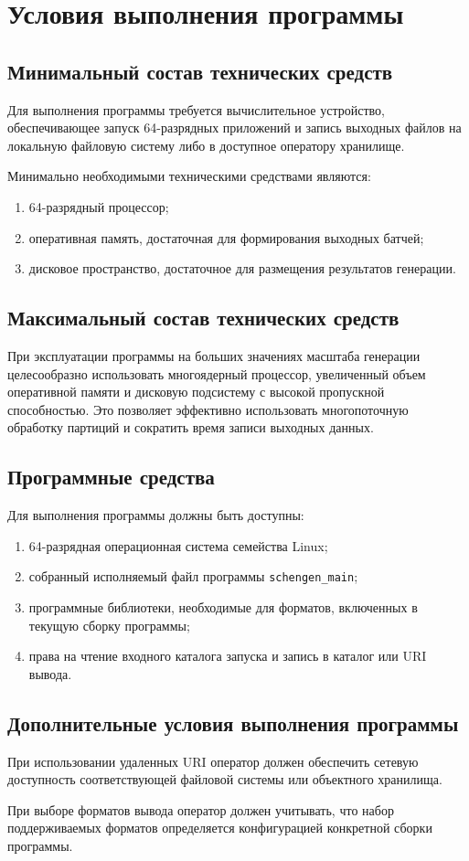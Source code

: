 \section{Условия выполнения программы}

\subsection{Минимальный состав технических средств}

Для выполнения программы требуется вычислительное устройство, обеспечивающее
запуск 64-разрядных приложений и запись выходных файлов на локальную файловую
систему либо в доступное оператору хранилище.

Минимально необходимыми техническими средствами являются:
\begin{enumerate}
    \item 64-разрядный процессор;
    \item оперативная память, достаточная для формирования выходных батчей;
    \item дисковое пространство, достаточное для размещения результатов
    генерации.
\end{enumerate}

\subsection{Максимальный состав технических средств}

При эксплуатации программы на больших значениях масштаба генерации
целесообразно использовать многоядерный процессор, увеличенный объем
оперативной памяти и дисковую подсистему с высокой пропускной способностью.
Это позволяет эффективно использовать многопоточную обработку партиций и
сократить время записи выходных данных.

\subsection{Программные средства}

Для выполнения программы должны быть доступны:
\begin{enumerate}
    \item 64-разрядная операционная система семейства Linux;
    \item собранный исполняемый файл программы \texttt{schengen\_main};
    \item программные библиотеки, необходимые для форматов, включенных в
    текущую сборку программы;
    \item права на чтение входного каталога запуска и запись в каталог или URI
    вывода.
\end{enumerate}

\subsection{Дополнительные условия выполнения программы}

При использовании удаленных URI оператор должен обеспечить сетевую доступность
соответствующей файловой системы или объектного хранилища.

При выборе форматов вывода оператор должен учитывать, что набор поддерживаемых
форматов определяется конфигурацией конкретной сборки программы.
